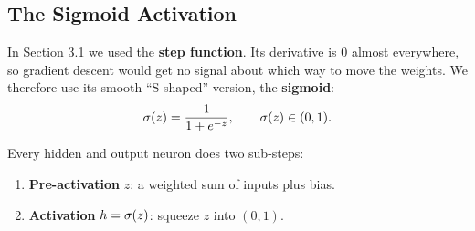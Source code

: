 \documentclass[12pt, a4paper]{article}
\begin{document}
\subsection{The Sigmoid Activation}

In Section 3.1 we used the \textbf{step function}. Its derivative is $0$
almost everywhere, so gradient descent would get no signal about which way
to move the weights. We therefore use its smooth ``S-shaped'' version, the
\textbf{sigmoid}:
\[
  \sigma(z) = \frac{1}{1 + e^{-z}}, \qquad \sigma(z) \in (0, 1).
\]

Every hidden and output neuron does two sub-steps:
\begin{enumerate}[nosep]
  \item \textbf{Pre-activation} $z$: a weighted sum of inputs plus bias.
  \item \textbf{Activation} $h = \sigma(z)$: squeeze $z$ into $(0,1)$.
\end{enumerate}
\end{document}
